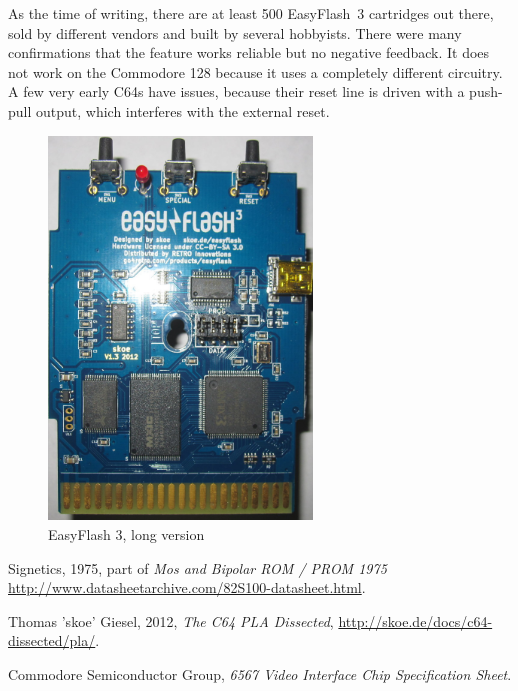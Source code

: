 \documentclass[a4paper,oneside]{memoir}
\begin{document}
As the time of writing, there are at least 500 EasyFlash~3 cartridges out there, sold by different vendors and built by several hobbyists.
There were many confirmations that the feature works reliable but no negative feedback.
It does not work on the Commodore 128 because it uses a completely different circuitry.
A few very early C64s have issues, because their reset line is driven with a push-pull output, which interferes with the external reset.

\begin{figure}[!h]
    \centering
    \includegraphics[width=7cm]{src/ef3-1-3}
    \caption{EasyFlash 3, long version}
    \label{fig:ef313}
\end{figure}

\begin{thebibliography}{999}

 Signetics, 1975, part of \textit{Mos and Bipolar ROM / PROM 1975}
\url{http://www.datasheetarchive.com/82S100-datasheet.html}.

 Thomas 'skoe' Giesel, 2012, \textit{The C64 PLA Dissected},
\url{http://skoe.de/docs/c64-dissected/pla/}.

 Commodore Semiconductor Group, \textit{6567 Video Interface Chip Specification Sheet}.

\end{thebibliography}
\end{document}
